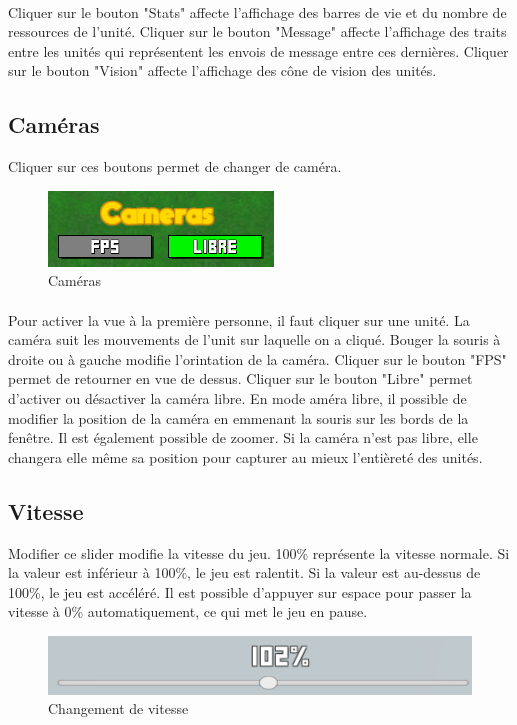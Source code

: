 \documentclass{report}
\begin{document}
\paragraph{}
Cliquer sur le bouton "Stats" affecte l'affichage des barres de vie et du nombre de ressources de l'unité. \newline
Cliquer sur le bouton "Message" affecte l'affichage des traits entre les unités qui représentent les envois de message entre ces dernières. \newline
Cliquer sur le bouton "Vision" affecte l'affichage des cône de vision des unités.

\subsection{Caméras}
Cliquer sur ces boutons permet de changer de caméra.
\begin{figure}[!h]
	\centering
		\includegraphics[scale=0.80]{camera.png}
	\caption{Caméras}
\end{figure}
\paragraph{}
Pour activer la vue à la première personne, il faut cliquer sur une unité. La caméra suit les mouvements de l'unit sur laquelle on a cliqué. Bouger la souris à droite ou à gauche modifie l'orintation de la caméra. Cliquer sur le bouton "FPS" permet de retourner en vue de dessus. \newline
Cliquer sur le bouton "Libre" permet d'activer ou désactiver la caméra libre. En mode améra libre, il possible de modifier la position de la caméra en emmenant la souris sur les bords de la fenêtre. Il est également possible de zoomer. Si la caméra n'est pas libre, elle changera elle même sa position pour capturer au mieux l'entièreté des unités.

\subsection{Vitesse}
Modifier ce slider modifie la vitesse du jeu. 100\% représente la vitesse normale. Si la valeur est inférieur à 100\%, le jeu est ralentit. Si la valeur est au-dessus de 100\%, le jeu est accéléré. \newline
Il est possible d'appuyer sur espace pour passer la vitesse à 0\% automatiquement, ce qui met le jeu en pause.
\begin{figure}[!h]
	\centering
		\includegraphics[scale=0.80]{vitesse.png}
	\caption{Changement de vitesse}
\end{figure}
\end{document}
